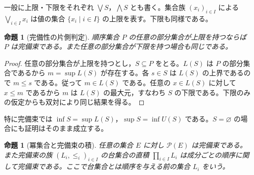 \documentclass[a5paper,10pt,dvipdfmx]{jsarticle}
\theoremstyle{definition}
\theoremstyle{plain}
\newtheorem{prop}[ruledef]{命題}
\newcommand{\Pow}{\mathcal{P}}
\begin{document}
一般に上限・下限をそれぞれ $\bigvee S$，$\bigwedge S$ とも書く。集合族 $(x_i)_{i\in I}$ による $\bigvee_{i\in I}x_i$ は値の集合 $\{x_i\mid i\in I\}$ の上限を表す。下限も同様である。
\begin{prop}[完備性の片側判定]\label{k86}
順序集合 $P$ の任意の部分集合が上限を持つならば $P$ は完備束である。また任意の部分集合が下限を持つ場合も同じである。
\end{prop}
\begin{proof}
任意の部分集合が上限を持つとし，$S\subseteq P$ をとる。$L(S)$ は $P$ の部分集合であるから $m=\sup L(S)$ が存在する。各 $s\in S$ は $L(S)$ の上界であるので $m\leq s$ である。従って $m\in L(S)$ である。任意の $x\in L(S)$ に対して $x\leq m$ であるから $m$ は $L(S)$ の最大元，すなわち $S$ の下限である。下限のみの仮定からも双対により同じ結果を得る。
\end{proof}
特に完備束では $\inf S=\sup L(S)$，$\sup S=\inf U(S)$ である。$S=\varnothing$ の場合にも証明はそのまま成立する。
\begin{prop}[冪集合と完備束の積]\label{k87}
任意の集合 $E$ に対し $\Pow(E)$ は完備束である。また完備束の族 $(L_i,\leq_i)_{i\in I}$ の台集合の直積 $\prod_{i\in I} L_i$ は成分ごとの順序に関して完備束である。ここで台集合とは順序を与える前の集合 $L_i$ をいう。
\end{prop}
\end{document}
